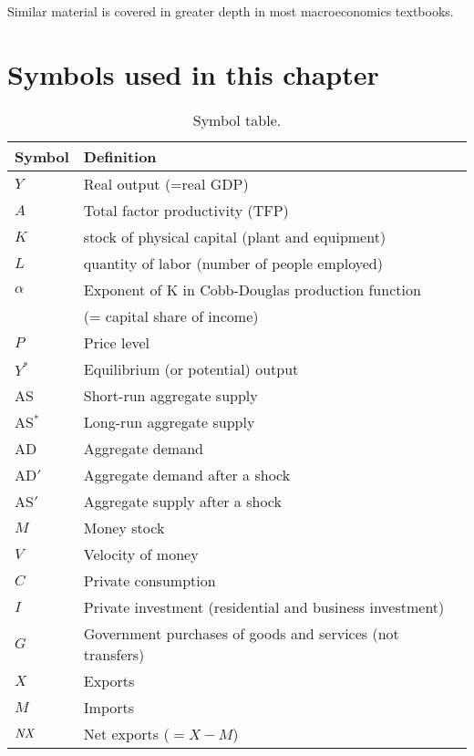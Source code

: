 Similar material is covered in greater depth
in most macroeconomics textbooks.

\section*{Symbols used in this chapter}

\begin{table}[H]
\centering
\caption{Symbol table.}
\begin{tabular*}{0.95\textwidth}{l@{\extracolsep{\fill}}l}
\toprule
Symbol & Definition\\
\midrule
$Y$    &Real output (=real GDP)\\
$A$    &Total factor productivity (TFP)\\
$K$    &stock of physical capital (plant and equipment)\\
$L$    &quantity of labor (number of people employed)\\
$\alpha$     &Exponent of K in Cobb-Douglas production function \\
        &(= capital share of income)\\
$P$    &Price level\\
$Y^*$    &Equilibrium (or potential) output\\
AS    &Short-run aggregate supply\\
AS$^*$    &Long-run aggregate supply\\
AD    &Aggregate demand\\
AD$'$    &Aggregate demand after a shock\\
AS$'$    &Aggregate supply after a shock\\
$M$    &Money stock\\
$V$    &Velocity of money\\
$C$    &Private consumption\\
$I$    &Private investment (residential and business investment)\\
$G$    &Government purchases of goods and services (not transfers)\\
$X$    &Exports\\
$M$    &Imports\\
$\mbox{\em NX\/}$    &Net exports ($=X-M$)\\
\bottomrule
\end{tabular*}
\end{table}


